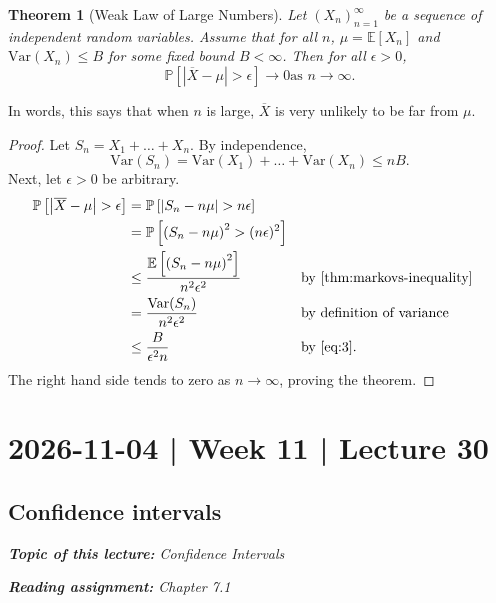 \documentclass[10pt]{article}
\newtheorem{theorem}{Theorem}
\theoremstyle{definition}
\newcommand{\1}[1]{\textbf{1}_{\left[#1\right]}} %
\def\E{\mathbb{E}} %
\def\P{\mathbb{P}} %
\def\Var{\mathrm{Var}} %
\begin{document}
\begin{theorem}[Weak Law of Large Numbers]
  \label{thm:weak-law-large-numbers}
  Let $(X_{n})_{n=1}^{\infty}$ be a sequence of independent random variables.
  Assume that for all $n$, $\mu= \E\left[X_{n} \right]$ and
  $\Var(X_{n}) \leq B$ for some fixed bound $B<\infty$. Then for all $\epsilon>0$,
  \begin{equation*}
    \P\left[ \left| \overline{X}-\mu \right| >\epsilon\right] \to 0 \text{
      as } n \to \infty.
  \end{equation*}
\end{theorem}
In words, this says that when $n$ is large, $\overline{X}$ is very unlikely to
be far from $\mu$. 

\begin{proof}
  Let $S_{n} = X_{1}+\ldots+X_{n}$. By independence,
  \begin{equation}\label{eq:3}
    \Var(S_{n}) = \Var(X_{1})+\ldots+\Var(X_{n}) \leq nB.
  \end{equation}
  Next, let $\epsilon>0$ be arbitrary.
  \begin{align*}
    \P\left[\left| \overline{X}-\mu \right| >\epsilon\right]
    &= \P\left[\left| S_{n}-n\mu \right|> n\epsilon \right]\\
    &= \P\left[ \left( S_{n}-n\mu \right)^{2} > (n\epsilon)^{2}  \right]\\
    &\leq  \frac{\E\left[\left( S_{n}-n\mu \right)^{2}
      \right]}{n^{2}\epsilon^{2}} &&\text{by \cref{thm:markovs-inequality}}\\
    &= \frac{\Var(S_{n})}{n^{2}\epsilon^{2}} &&\text{by definition of variance }\\
    &\leq \frac{B}{\epsilon^{2}n} &&\text{by \cref{eq:3}}.
  \end{align*}
  The right hand side tends to zero as $n \to \infty$, proving the theorem.
\end{proof}
\newpage

\section{2026-11-04 | Week 11 | Lecture 30}

\subsection{Confidence intervals}
\begin{center}
  \begin{tcolorbox}[width=0.9\textwidth, colback=white, colframe=black]
    \textit{\textbf{Topic of this lecture:} Confidence Intervals}

    \textit{\textbf{Reading assignment:} Chapter 7.1}
  \end{tcolorbox}
\end{center}
\end{document}
